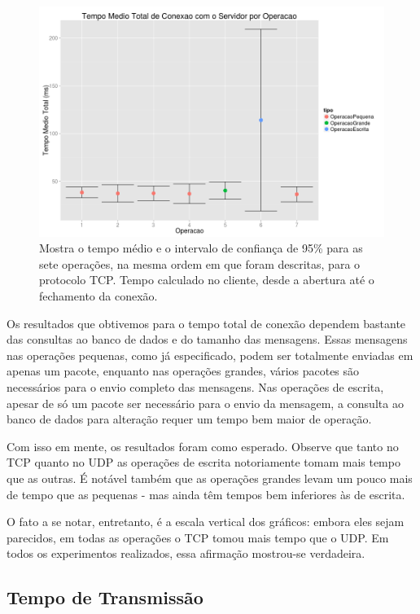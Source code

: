 \documentclass[12pt,a4paper]{article}
\begin{document}
\begin{figure}[h]
\centering
\includegraphics[width=\textwidth]{diagrama/resultadosTempoTotal.png}
\caption{Mostra o tempo médio e o intervalo de confiança de 95\% para as sete operações, na mesma ordem em que foram descritas, para o protocolo TCP. Tempo calculado no cliente, desde a abertura até o fechamento da conexão.}
\label{fig:totalT}
\end{figure}

Os resultados que obtivemos para o tempo total de conexão dependem bastante das consultas ao banco de dados e do tamanho das mensagens. Essas mensagens nas operações pequenas, como já especificado, podem ser totalmente enviadas em apenas um pacote, enquanto nas operações grandes, vários pacotes são necessários para o envio completo das mensagens. Nas operações de escrita, apesar de só um pacote ser necessário para o envio da mensagem, a consulta ao banco de dados para alteração requer um tempo bem maior de operação.

Com isso em mente, os resultados foram como esperado. Observe que tanto no TCP quanto no UDP as operações de escrita notoriamente tomam mais tempo que as outras. É notável também que as operações grandes levam um pouco mais de tempo que as pequenas - mas ainda têm tempos bem inferiores às de escrita.

O fato a se notar, entretanto, é a escala vertical dos gráficos: embora eles sejam parecidos, em todas as operações o TCP tomou mais tempo que o UDP. Em todos os experimentos realizados, essa afirmação mostrou-se verdadeira.

\subsection{Tempo de Transmissão}
\end{document}
